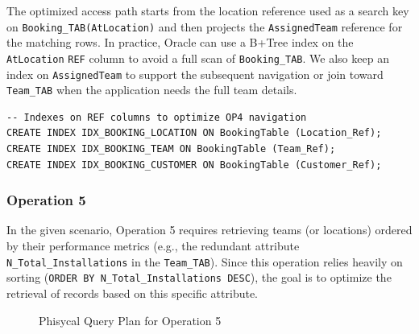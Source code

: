 \documentclass[12pt,a4paper]{article}
\begin{document}
The optimized access path starts from the location reference used as a search key on \texttt{Booking\_TAB(AtLocation)} and then projects the \texttt{AssignedTeam} reference for the matching rows. In practice, Oracle can use a B+Tree index on the \texttt{AtLocation} \texttt{REF} column to avoid a full scan of \texttt{Booking\_TAB}. We also keep an index on \texttt{AssignedTeam} to support the subsequent navigation or join toward \texttt{Team\_TAB} when the application needs the full team details.

\begin{verbatim}
-- Indexes on REF columns to optimize OP4 navigation
CREATE INDEX IDX_BOOKING_LOCATION ON BookingTable (Location_Ref);
CREATE INDEX IDX_BOOKING_TEAM ON BookingTable (Team_Ref);
CREATE INDEX IDX_BOOKING_CUSTOMER ON BookingTable (Customer_Ref);
\end{verbatim}

\subsubsection*{Operation 5}

In the given scenario, Operation 5 requires retrieving teams (or locations) ordered by their performance metrics (e.g., the redundant attribute \texttt{N\_Total\_Installations} in the \texttt{Team\_TAB}). Since this operation relies heavily on sorting (\texttt{ORDER BY N\_Total\_Installations DESC}), the goal is to optimize the retrieval of records based on this specific attribute.

\begin{figure}[h!]
    \centering
    \caption{Phisycal Query Plan for Operation 5}
\end{figure}
\end{document}

